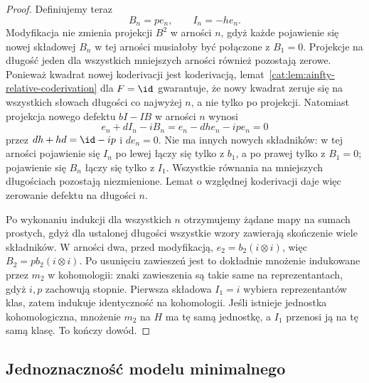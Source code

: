 \begin{proof}
Definiujemy teraz
\begin{equation}\label{cat:eq:ainfty-transfer-recursion}
 B_n=p e_n,\qquad I_n=-h e_n.
\end{equation}
Modyfikacja nie zmienia projekcji $B^2$ w arności $n$, gdyż każde pojawienie się nowej składowej $B_n$ w tej arności musiałoby być połączone z $B_1=0$. Projekcje na długość jeden dla wszystkich mniejszych arności również pozostają zerowe. Ponieważ kwadrat nowej koderivacji jest koderivacją, lemat~\ref{cat:lem:ainfty-relative-coderivation} dla $F=\id$ gwarantuje, że nowy kwadrat zeruje się na wszystkich słowach długości co najwyżej $n$, a nie tylko po projekcji. Natomiast projekcja nowego defektu $bI-IB$ w arności $n$ wynosi
\[
 e_n+d I_n-i B_n=e_n-dh e_n-ip e_n=0
\]
przez $dh+hd=\id-ip$ i $de_n=0$. Nie ma innych nowych składników: w tej arności pojawienie się $I_n$ po lewej łączy się tylko z $b_1$, a po prawej tylko z $B_1=0$; pojawienie się $B_n$ łączy się tylko z $I_1$. Wszystkie równania na mniejszych długościach pozostają niezmienione. Lemat o względnej koderivacji daje więc zerowanie defektu na długości $n$.

Po wykonaniu indukcji dla wszystkich $n$ otrzymujemy żądane mapy na sumach prostych, gdyż dla ustalonej długości wszystkie wzory zawierają skończenie wiele składników. W arności dwa, przed modyfikacją, $e_2=b_2(i\otimes i)$, więc $B_2=p b_2(i\otimes i)$. Po usunięciu zawieszeń jest to dokładnie mnożenie indukowane przez $m_2$ w kohomologii: znaki zawieszenia są takie same na reprezentantach, gdyż $i,p$ zachowują stopnie. Pierwsza składowa $I_1=i$ wybiera reprezentantów klas, zatem indukuje identyczność na kohomologii. Jeśli istnieje jednostka kohomologiczna, mnożenie $m_2$ na $H$ ma tę samą jednostkę, a $I_1$ przenosi ją na tę samą klasę. To kończy dowód.
\end{proof}

\subsection{Jednoznaczność modelu minimalnego}

